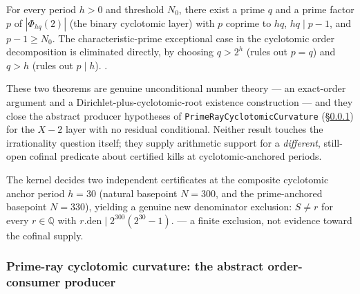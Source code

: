 \begin{thm}
For every period $h>0$ and threshold $N_0$, there exist a prime $q$ and a
prime factor $p$ of $|\Phi_{hq}(2)|$ (the binary cyclotomic layer) with $p$
coprime to $hq$, $hq\mid p-1$, and $p-1\ge N_0$. The characteristic-prime
exceptional case in the cyclotomic order decomposition is eliminated
directly, by choosing $q>2^h$ (rules out $p=q$) and $q>h$ (rules out
$p\mid h$).
\quad {}
\quad {} \quad {} \quad {}.
\end{thm}

\begin{obs}
These two theorems are genuine unconditional number theory --- an exact-order
argument and a Dirichlet-plus-cyclotomic-root existence construction --- and
they close the abstract producer hypotheses of
\texttt{PrimeRayCyclotomicCurvature} (\S\ref{prime-ray-curvature}) for the
$X-2$ layer with no residual conditional. Neither result touches the
irrationality question itself; they supply arithmetic support for a
\emph{different}, still-open cofinal predicate about certified kills at
cyclotomic-anchored periods.
\end{obs}

\begin{obs}
The kernel decides two independent certificates at the composite cyclotomic
anchor period $h=30$ (natural basepoint $N=300$, and the prime-anchored
basepoint $N=330$), yielding a genuine new denominator exclusion:
$S\ne r$ for every $r\in\mathbb{Q}$ with $r.\mathrm{den}\mid 2^{300}(2^{30}-1)$.
\quad {}
\quad {} \quad {} \quad {} --- a
finite exclusion, not evidence toward the cofinal supply.
\end{obs}

\subsubsection{Prime-ray cyclotomic curvature: the abstract order-consumer producer}
\label{prime-ray-curvature}

